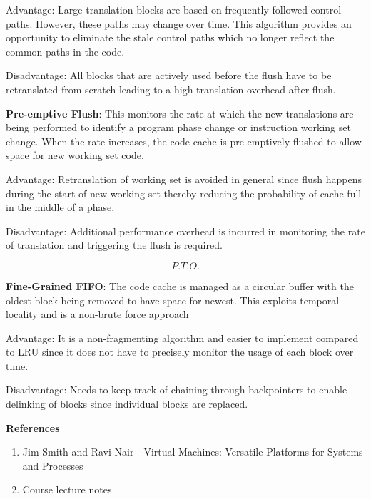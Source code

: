 \documentclass[11pt,a4paper,oneside]{article}
\begin{document}
\begin{enumerate}
		Advantage: Large translation blocks are based on frequently followed control paths. However, these paths may change over time. This algorithm provides an opportunity to eliminate the stale control paths which no longer reflect the common paths in the code.
		
		Disadvantage: All blocks that are actively used before the flush have to be retranslated from scratch leading to a high translation overhead after flush.
		
		\textbf{Pre-emptive Flush}: This monitors the rate at which the new translations are being performed to identify a program phase change or instruction working set change. When the rate increases, the code cache is pre-emptively flushed to allow space for new working set code. 
		
		Advantage: Retranslation of working set is avoided in general since flush happens during the start of new working set thereby reducing the probability of cache full in the middle of a phase. 
		
		Disadvantage: Additional performance overhead is incurred in monitoring the rate of translation and triggering the flush is required. 
		
		$$P.T.O.$$
		
		\newpage
		
		\textbf{Fine-Grained FIFO}: The code cache is managed as a circular buffer with the oldest block being removed to have space for newest. This exploits temporal locality and is a non-brute force approach
		
		Advantage: It is a non-fragmenting algorithm and easier to implement compared to LRU since it does not have to precisely monitor the usage of each block over time.
		
		Disadvantage: Needs to keep track of chaining through backpointers to enable delinking of blocks since individual blocks are replaced. 
		
 		
     	
		
	        			
	\end{enumerate}
    
    \textbf{References}
    \begin{enumerate}
    	\item Jim Smith and Ravi Nair - Virtual Machines: Versatile Platforms for Systems and Processes  	
    	\item Course lecture notes
    \end{enumerate}
 

    
\end{document}
